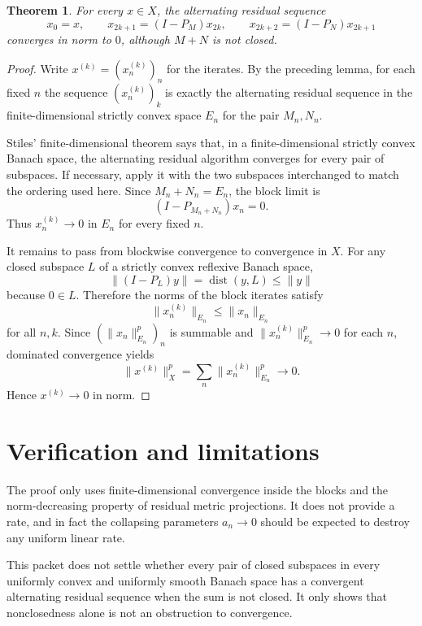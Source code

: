 \documentclass[11pt]{article}
\newtheorem{theorem}{Theorem}
\DeclareMathOperator{\dist}{dist}
\begin{document}
\begin{theorem}
For every \(x\in X\), the alternating residual sequence
\[
  x_0=x,\qquad x_{2k+1}=(I-P_M)x_{2k},\qquad
  x_{2k+2}=(I-P_N)x_{2k+1}
\]
converges in norm to \(0\), although \(M+N\) is not closed.
\end{theorem}

\begin{proof}
Write \(x^{(k)}=(x_n^{(k)})_n\) for the iterates.  By the preceding lemma, for each fixed \(n\) the sequence \((x_n^{(k)})_k\) is exactly the alternating residual sequence in the finite-dimensional strictly convex space \(E_n\) for the pair \(M_n,N_n\).

Stiles' finite-dimensional theorem says that, in a finite-dimensional strictly convex Banach space, the alternating residual algorithm converges for every pair of subspaces.  If necessary, apply it with the two subspaces interchanged to match the ordering used here.  Since \(M_n+N_n=E_n\), the block limit is
\[
  (I-P_{M_n+N_n})x_n=0.
\]
Thus \(x_n^{(k)}\to0\) in \(E_n\) for every fixed \(n\).

It remains to pass from blockwise convergence to convergence in \(X\).  For any closed subspace \(L\) of a strictly convex reflexive Banach space,
\[
  \|(I-P_L)y\|=\dist(y,L)\leq \|y\|
\]
because \(0\in L\).  Therefore the norms of the block iterates satisfy
\[
  \|x_n^{(k)}\|_{E_n}\leq \|x_n\|_{E_n}
\]
for all \(n,k\).  Since \((\|x_n\|_{E_n}^p)_n\) is summable and \(\|x_n^{(k)}\|_{E_n}^p\to0\) for each \(n\), dominated convergence yields
\[
  \|x^{(k)}\|_X^p=\sum_n \|x_n^{(k)}\|_{E_n}^p\longrightarrow 0.
\]
Hence \(x^{(k)}\to0\) in norm.
\end{proof}

\section*{Verification and limitations}

The proof only uses finite-dimensional convergence inside the blocks and the norm-decreasing property of residual metric projections.  It does not provide a rate, and in fact the collapsing parameters \(a_n\to0\) should be expected to destroy any uniform linear rate.

This packet does not settle whether every pair of closed subspaces in every uniformly convex and uniformly smooth Banach space has a convergent alternating residual sequence when the sum is not closed.  It only shows that nonclosedness alone is not an obstruction to convergence.
\end{document}
